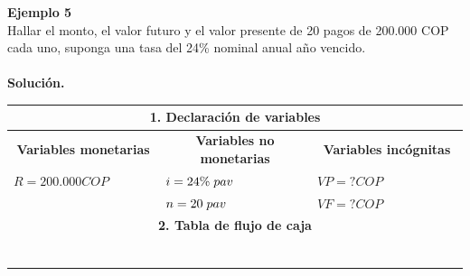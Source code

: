 \textbf{Ejemplo 5}\\
Hallar el monto, el valor futuro y el valor presente de 20 pagos de 200.000 COP cada uno, suponga una tasa del 24\% nominal anual año vencido.\\ \\
\textbf{Solución.}
\begin{center}
 \renewcommand{\arraystretch}{1.5}%
 \begin{longtable}[H]{|p{0.333\linewidth}|p{0.3333\linewidth}|p{0.3333\linewidth}|}
  \hline
  \multicolumn{3}{|c|}{\cellcolor[HTML]{FFB183}\textbf{1. Declaración de variables}}                   \\ \hline
  \multicolumn{1}{|c|}{\cellcolor[HTML]{FFB183}\textbf{Variables monetarias}}                   & \multicolumn{1}{|c|}{\cellcolor[HTML]{FFB183}\textbf{Variables no monetarias}}                   & \multicolumn{1}{|c|}{\cellcolor[HTML]{FFB183}\textbf{Variables incógnitas}}                                                                         \\ \hline
  $R= 200{.}000 COP$         & $i=24\% \hspace{1mm} pav$ & $VP = ? COP$                                  \\
                           & $n=20 \hspace{1mm} pav$   & $VF= ? COP$                                   \\ \hline
  \multicolumn{3}{|c|}{\cellcolor[HTML]{FFB183}\textbf{2. Tabla de flujo de caja}}                     \\ \hline
  \multicolumn{3}{|p{\columnwidth}|}{
  \begin{center}
   \begin{tabular}{ |p{3.5cm}| p{3cm}|}
    \hline


\end{tabular}
\end{center}}
\end{longtable}
\end{center}

